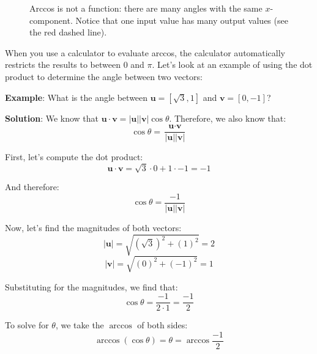 \begin{figure}[htbp]
    \centering
    \caption{Arccos is not a function: there are many angles with the same 
    $x$-component. Notice that one input value has many output values (see the 
    red dashed line).}
    \label{fig:arccos}
\end{figure}

When you use a calculator to evaluate arccos, the calculator automatically 
restricts the results to between $0$ and $\pi$. Let's look at an example of 
using the dot product to determine the angle between two vectors:

\textbf{Example}: What is the angle between $\textbf{u} = \left[ \sqrt{3}, 1 
\right]$ and $\textbf{v} = \left[ 0, -1 \right]$?

\textbf{Solution}: We know that $\textbf{u} \cdot \textbf{v} = \left| 
\textbf{u} \right| \left| \textbf{v} \right| \cos{\theta}$. Therefore, we also 
know that:
$$\cos{\theta} = \frac{\textbf{u} \cdot \textbf{v}}{\left| \textbf{u} \right| 
\left| \textbf{v} \right|}$$

First, let's compute the dot product:
$$\textbf{u} \cdot \textbf{v} = \sqrt{3} \cdot 0 + 1 \cdot -1 = -1$$

And therefore:
$$\cos{\theta} = \frac{-1}{\left| \textbf{u} \right| \left| \textbf{v} 
\right|}$$

Now, let's find the magnitudes of both vectors:
$$\left| \textbf{u} \right| = \sqrt{\left( \sqrt{3} \right)^2 + \left( 1 
\right)^2} = 2$$
$$\left| \textbf{v} \right| = \sqrt{\left( 0 \right)^2 + \left( -1 \right)^2} 
= 1$$

Substituting for the magnitudes, we find that:
$$\cos{\theta} = \frac{-1}{2 \cdot 1} = \frac{-1}{2}$$

To solve for $\theta$, we take the $\arccos$ of both sides:
$$\arccos{ \left( \cos{\theta} \right)} = \theta = \arccos{ \frac{-1}{2} }$$

